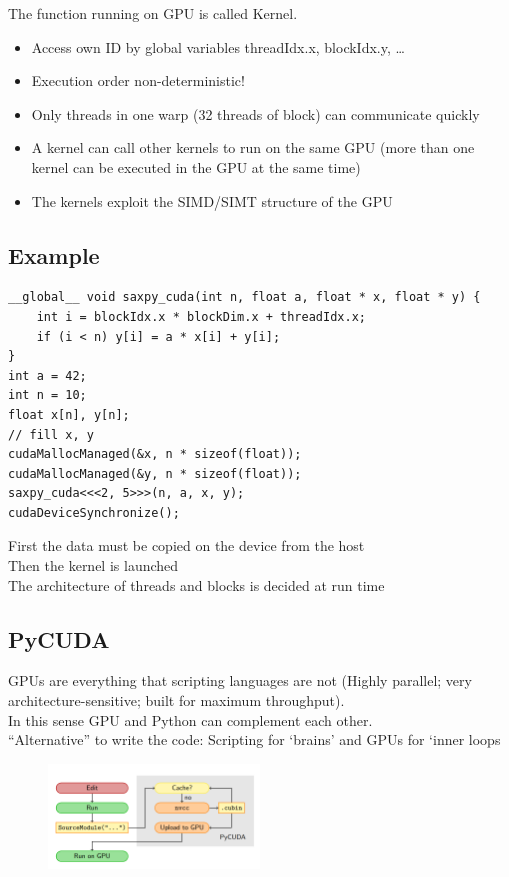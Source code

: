 The function running on GPU is called Kernel.
\begin{itemize}
	\item Access own ID by global variables threadIdx.x, blockIdx.y, …
	\item Execution order non-deterministic!
	\item Only threads in one warp (32 threads of block) can communicate quickly
	\item A kernel can call other kernels to run on the same GPU (more than one kernel can be executed in the GPU at the same time)
	\item The kernels exploit the SIMD/SIMT structure of the GPU
\end{itemize}


\subsection{Example}

\begin{verbatim}
__global__ void saxpy_cuda(int n, float a, float * x, float * y) {
	int i = blockIdx.x * blockDim.x + threadIdx.x;
	if (i < n) y[i] = a * x[i] + y[i];
}
int a = 42;
int n = 10;
float x[n], y[n];
// fill x, y
cudaMallocManaged(&x, n * sizeof(float));
cudaMallocManaged(&y, n * sizeof(float));
saxpy_cuda<<<2, 5>>>(n, a, x, y);
cudaDeviceSynchronize();
\end{verbatim}

First the data must be copied on the device from the host\\
Then the kernel is launched\\
The architecture of threads and blocks is decided at run time\\


\subsection{PyCUDA}
GPUs are everything that scripting languages are not (Highly parallel; very architecture-sensitive; built for maximum throughput).\\
In this sense GPU and Python can complement each other.\\
“Alternative” to write the code: Scripting for ‘brains’ and GPUs for ‘inner loops


\begin{figure}[ht]
	\centering
	\includegraphics[width=0.5\textwidth]{figure_parallel/pycuda.png}
\end{figure}
\FloatBarrier



